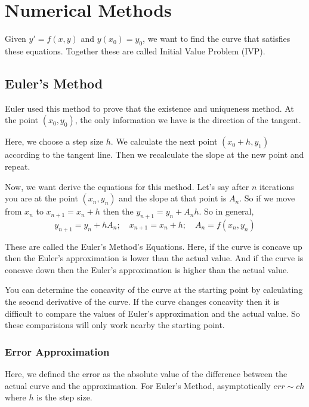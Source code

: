 

\chapter{Numerical Methods}  

\bigbreak

Given $y' = f(x, y)$ and  $y(x_0) = y_0$, we want to find the curve that satisfies these equations.
Together these are called Initial Value Problem (IVP).

\section{Euler's Method}

Euler used this method to prove that the existence and uniqueness method.
At the point $(x_0, y_0)$, the only information we have is the direction of the tangent.

Here, we choose a step size $h$. 
We calculate the next point $(x_0 + h, y_1)$ according to the tangent line.
Then we recalculate the slope at the new point and repeat.

Now, we want derive the equations for this method.
Let's say after $n$ iterations you are at the point $(x_n, y_n)$ and the slope at that point is $A_n$.
So if we move from $x_n$ to $x_{n+1} = x_n + h$ then the $y_{n+1} = y_n + A_n h$.
So in general, 
$$ y_{n+1} = y_n + h A_n ; \quad x_{n+1} = x_n + h; \quad A_n = f(x_n, y_n) $$

These are called the Euler's Method's Equations. 
Here, if the curve is concave up then the Euler's approximation is lower than the actual value.
And if the curve is concave down then the Euler's approximation is higher than the actual value.

You can determine the concavity of the curve at the starting point by calculating the seocnd derivative of the curve.
If the curve changes concavity then it is difficult to compare the values of Euler's approximation and the actual value.
So these comparisions will only work nearby the starting point.
 
\subsection{Error Approximation}

Here, we defined the error as the absolute value of the difference between the actual curve and the approximation.
For Euler's Method, asymptotically $err \sim c h$ where $h$ is the step size.

